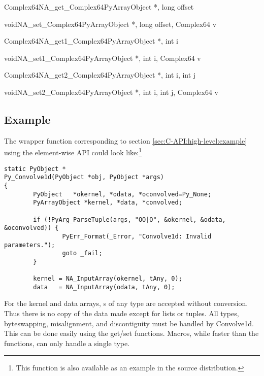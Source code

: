 \begin{cfuncdesc}{Complex64}{NA_get_Complex64}{PyArrayObject *, long offset}
\end{cfuncdesc}
\begin{cfuncdesc}{void}{NA_set_Complex64}{PyArrayObject *, long offset, Complex64 v}
\end{cfuncdesc}
\begin{cfuncdesc}{Complex64}{NA_get1_Complex64}{PyArrayObject *, int i}
\end{cfuncdesc}
\begin{cfuncdesc}{void}{NA_set1_Complex64}{PyArrayObject *, int i, Complex64 v}
\end{cfuncdesc}
\begin{cfuncdesc}{Complex64}{NA_get2_Complex64}{PyArrayObject *, int i, int j}
\end{cfuncdesc}
\begin{cfuncdesc}{void}{NA_set2_Complex64}{PyArrayObject *, int i, int j, Complex64 v}
\end{cfuncdesc}

\subsection{Example}
\label{sec:C-API:element-wise:example}

The  wrapper function corresponding to section
\ref{sec:C-API:high-level:example} using the element-wise API could look
like:\footnote{This function is also available as an example in the source
   distribution.}

\begin{verbatim}
static PyObject *
Py_Convolve1d(PyObject *obj, PyObject *args)
{
        PyObject   *okernel, *odata, *oconvolved=Py_None;
        PyArrayObject *kernel, *data, *convolved;

        if (!PyArg_ParseTuple(args, "OO|O", &okernel, &odata, &oconvolved)) {
                PyErr_Format(_Error, "Convolve1d: Invalid parameters.");
                goto _fail;
        }

        kernel = NA_InputArray(okernel, tAny, 0);
        data   = NA_InputArray(odata, tAny, 0);
\end{verbatim}

For the kernel and data arrays, s of any type are accepted
without conversion.  Thus there is no copy of the data made except for lists or
tuples.  All types, byteswapping, misalignment, and discontiguity must be
handled by Convolve1d.  This can be done easily using the get/set functions.
Macros, while faster than the functions, can only handle a single type.

